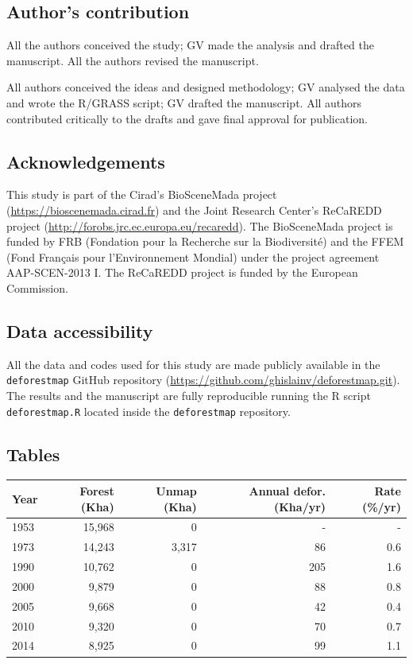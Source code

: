 \documentclass[]{article}
\begin{document}
\hypertarget{authors-contribution}{%
\subsection{Author's contribution}\label{authors-contribution}}

All the authors conceived the study; GV made the analysis and drafted
the manuscript. All the authors revised the manuscript.

All authors conceived the ideas and designed methodology; GV analysed
the data and wrote the R/GRASS script; GV drafted the manuscript. All
authors contributed critically to the drafts and gave final approval for
publication.

\hypertarget{acknowledgements}{%
\subsection{Acknowledgements}\label{acknowledgements}}

This study is part of the Cirad's BioSceneMada project
(\url{https://bioscenemada.cirad.fr}) and the Joint Research Center's
ReCaREDD project (\url{http://forobs.jrc.ec.europa.eu/recaredd}). The
BioSceneMada project is funded by FRB (Fondation pour la Recherche sur
la Biodiversité) and the FFEM (Fond Français pour l'Environnement
Mondial) under the project agreement AAP-SCEN-2013 I. The ReCaREDD
project is funded by the European Commission.

\hypertarget{data-accessibility}{%
\subsection{Data accessibility}\label{data-accessibility}}

All the data and codes used for this study are made publicly available
in the \texttt{deforestmap} GitHub repository
(\url{https://github.com/ghislainv/deforestmap.git}). The results and
the manuscript are fully reproducible running the R script
\texttt{deforestmap.R} located inside the \texttt{deforestmap}
repository.

\hypertarget{tables}{%
\subsection{Tables}\label{tables}}

\begin{longtable}[]{@{}lrrrr@{}}
\toprule
Year & Forest (Kha) & Unmap (Kha) & Annual defor. (Kha/yr) & Rate
(\%/yr)\tabularnewline
\midrule
\endhead
1953 & 15,968 & 0 & - & -\tabularnewline
1973 & 14,243 & 3,317 & 86 & 0.6\tabularnewline
1990 & 10,762 & 0 & 205 & 1.6\tabularnewline
2000 & 9,879 & 0 & 88 & 0.8\tabularnewline
2005 & 9,668 & 0 & 42 & 0.4\tabularnewline
2010 & 9,320 & 0 & 70 & 0.7\tabularnewline
2014 & 8,925 & 0 & 99 & 1.1\tabularnewline
\bottomrule
\end{longtable}
\end{document}
